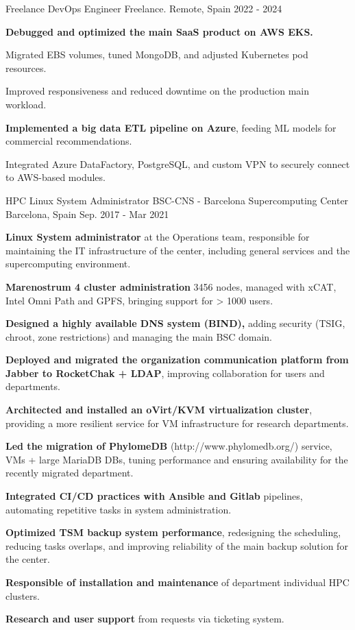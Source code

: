 \begin{cventries}
\cventry
{Freelance DevOps Engineer} %
{Freelance.} %
{Remote, Spain} %
{2022 - 2024 } %
{ %
	\begin{cvitems}
		\item{\textbf{Debugged and optimized the main SaaS product on AWS EKS.}}
        \item{Migrated EBS volumes, tuned MongoDB, and adjusted Kubernetes pod resources.}
        \item{Improved responsiveness and reduced downtime on the production main workload.}
        \item{\textbf{Implemented a big data ETL pipeline on Azure}, feeding ML models for commercial recommendations.}
		\item{Integrated Azure DataFactory, PostgreSQL, and custom VPN to securely connect to AWS-based modules.}
	\end{cvitems}
}

\cventry
{HPC Linux System Administrator} %
{BSC-CNS - Barcelona Supercomputing Center} %
{Barcelona, Spain} %
{Sep. 2017 - Mar 2021} %
{ %
	\begin{cvitems}
		\item{\textbf{Linux System administrator} at the Operations team, responsible for maintaining the IT infrastructure of the center, including general services and the supercomputing environment.}
        \item{\textbf{Marenostrum 4 cluster administration} 3456 nodes, managed with xCAT, Intel Omni Path and GPFS, bringing support for > 1000 users.}
        \item{\textbf{Designed a highly available DNS system (BIND),} adding security (TSIG, chroot, zone restrictions) and managing the main BSC domain.}
		\item{\textbf{Deployed and migrated the organization communication platform from Jabber to RocketChak + LDAP}, improving collaboration for users and departments.}
  		\item{\textbf{Architected and installed an oVirt/KVM virtualization cluster}, providing a more resilient service for VM infrastructure for research departments.}
  		\item{\textbf{Led the migration of PhylomeDB} (http://www.phylomedb.org/) service, VMs + large MariaDB DBs, tuning performance and ensuring availability for the recently migrated department.}
        \item{\textbf{Integrated CI/CD practices with Ansible and Gitlab} pipelines, automating repetitive tasks in system administration.}
        \item{\textbf{Optimized TSM backup system performance}, redesigning the scheduling, reducing tasks overlaps, and improving reliability of the main backup solution for the center.}
        \item{\textbf{Responsible of installation and maintenance} of department individual HPC clusters.}
        \item{\textbf{Research and user support} from requests via ticketing system.}
	\end{cvitems}
}


\end{cventries}
